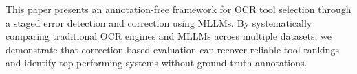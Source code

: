 \documentclass[11pt]{article}
\begin{document}
This paper presents an annotation-free framework for OCR tool selection through a staged error detection and correction using MLLMs. By systematically comparing traditional OCR engines and MLLMs across multiple datasets, we demonstrate that correction-based evaluation can recover reliable tool rankings and identify top-performing systems without ground-truth annotations.


%




\end{document}
